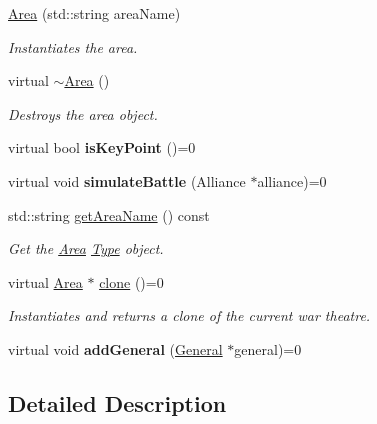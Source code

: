 \begin{DoxyCompactItemize}
\item 
\mbox{\label{classArea_a765c2ee1798421e3079ab77f97abf367}} 
\hyperlink{classArea_a765c2ee1798421e3079ab77f97abf367}{Area} (std\+::string area\+Name)
\begin{DoxyCompactList}\small\item\em Instantiates the area. \end{DoxyCompactList}\item 
\mbox{\label{classArea_ace0975982b61a16746c564a0d43a4cc8}} 
virtual \hyperlink{classArea_ace0975982b61a16746c564a0d43a4cc8}{$\sim$\+Area} ()
\begin{DoxyCompactList}\small\item\em Destroys the area object. \end{DoxyCompactList}\item 
\mbox{\label{classArea_a5572fd57878be1d0d1f243de4be742db}} 
virtual bool {\bfseries is\+Key\+Point} ()=0
\item 
\mbox{\label{classArea_a21450849c93621152b13bafcf6e248d5}} 
virtual void {\bfseries simulate\+Battle} (Alliance $\ast$alliance)=0
\item 
std\+::string \hyperlink{classArea_ad67916df281b6b172c4423627b65062a}{get\+Area\+Name} () const
\begin{DoxyCompactList}\small\item\em Get the \hyperlink{classArea}{Area} \hyperlink{classType}{Type} object. \end{DoxyCompactList}\item 
virtual \hyperlink{classArea}{Area} $\ast$ \hyperlink{classArea_a383d61c76b8fac66ef903036d776a3a4}{clone} ()=0
\begin{DoxyCompactList}\small\item\em Instantiates and returns a clone of the current war theatre. \end{DoxyCompactList}\item 
\mbox{\label{classArea_ae3e229ab4fb2e5b19fc8cfedf078bc95}} 
virtual void {\bfseries add\+General} (\hyperlink{classGeneral}{General} $\ast$general)=0
\end{DoxyCompactItemize}


\subsection{Detailed Description}


